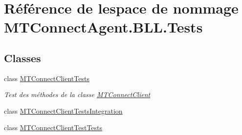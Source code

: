 \hypertarget{namespace_m_t_connect_agent_1_1_b_l_l_1_1_tests}{}\section{Référence de l\textquotesingle{}espace de nommage M\+T\+Connect\+Agent.\+B\+L\+L.\+Tests}
\label{namespace_m_t_connect_agent_1_1_b_l_l_1_1_tests}
\subsection*{Classes}
\begin{DoxyCompactItemize}
\item 
class \mbox{\hyperlink{class_m_t_connect_agent_1_1_b_l_l_1_1_tests_1_1_m_t_connect_client_tests}{M\+T\+Connect\+Client\+Tests}}
\begin{DoxyCompactList}\small\item\em Test des méthodes de la classe \mbox{\hyperlink{class_m_t_connect_agent_1_1_b_l_l_1_1_m_t_connect_client}{M\+T\+Connect\+Client}} \end{DoxyCompactList}\item 
class \mbox{\hyperlink{class_m_t_connect_agent_1_1_b_l_l_1_1_tests_1_1_m_t_connect_client_tests_integration}{M\+T\+Connect\+Client\+Tests\+Integration}}
\item 
class \mbox{\hyperlink{class_m_t_connect_agent_1_1_b_l_l_1_1_tests_1_1_m_t_connect_client_test_tests}{M\+T\+Connect\+Client\+Test\+Tests}}
\end{DoxyCompactItemize}

